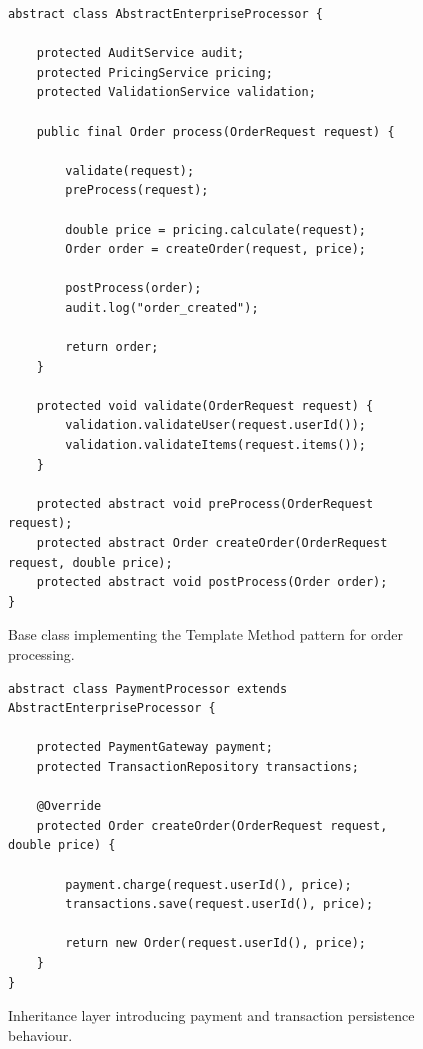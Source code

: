 \begin{figure}[t]
\centering
\begin{verbatim}
abstract class AbstractEnterpriseProcessor {

    protected AuditService audit;
    protected PricingService pricing;
    protected ValidationService validation;

    public final Order process(OrderRequest request) {

        validate(request);
        preProcess(request);

        double price = pricing.calculate(request);
        Order order = createOrder(request, price);

        postProcess(order);
        audit.log("order_created");

        return order;
    }

    protected void validate(OrderRequest request) {
        validation.validateUser(request.userId());
        validation.validateItems(request.items());
    }

    protected abstract void preProcess(OrderRequest request);
    protected abstract Order createOrder(OrderRequest request, double price);
    protected abstract void postProcess(Order order);
}
\end{verbatim}
\caption{Base class implementing the Template Method pattern for order processing.}
\label{fig:abstract_processor}
\end{figure}


\begin{figure}[t]
\centering
\begin{verbatim}
abstract class PaymentProcessor extends AbstractEnterpriseProcessor {

    protected PaymentGateway payment;
    protected TransactionRepository transactions;

    @Override
    protected Order createOrder(OrderRequest request, double price) {

        payment.charge(request.userId(), price);
        transactions.save(request.userId(), price);

        return new Order(request.userId(), price);
    }
}
\end{verbatim}
\caption{Inheritance layer introducing payment and transaction persistence behaviour.}
\label{fig:payment_processor}
\end{figure}



